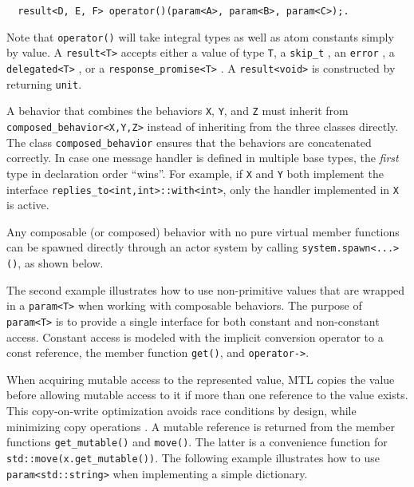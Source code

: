 \begin{lstlisting}
  result<D, E, F> operator()(param<A>, param<B>, param<C>);.
\end{lstlisting}

Note that \lstinline^operator()^ will take integral types as well as atom
constants simply by value. A \lstinline^result<T>^ accepts either a value of
type \lstinline^T^, a \lstinline^skip_t^ , an
\lstinline^error^ , a \lstinline^delegated<T>^ , or a
\lstinline^response_promise<T>^ . A \lstinline^result<void>^ is
constructed by returning \lstinline^unit^.

A behavior that combines the behaviors \lstinline^X^, \lstinline^Y^, and
\lstinline^Z^ must inherit from \lstinline^composed_behavior<X,Y,Z>^ instead of
inheriting from the three classes directly. The class
\lstinline^composed_behavior^ ensures that the behaviors are concatenated
correctly. In case one message handler is defined in multiple base types, the
\emph{first} type in declaration order ``wins''. For example, if \lstinline^X^
and \lstinline^Y^ both implement the interface
\lstinline^replies_to<int,int>::with<int>^, only the handler implemented in
\lstinline^X^ is active.

Any composable (or composed) behavior with no pure virtual member functions can
be spawned directly through an actor system by calling
\lstinline^system.spawn<...>()^, as shown below.


\clearpage

The second example illustrates how to use non-primitive values that are wrapped
in a \lstinline^param<T>^ when working with composable behaviors. The purpose
of \lstinline^param<T>^ is to provide a single interface for both constant and
non-constant access. Constant access is modeled with the implicit conversion
operator to a const reference, the member function \lstinline^get()^, and
\lstinline^operator->^.

When acquiring mutable access to the represented value, MTL copies the value
before allowing mutable access to it if more than one reference to the value
exists. This copy-on-write optimization avoids race conditions by design, while
minimizing copy operations . A mutable reference is returned
from the member functions \lstinline^get_mutable()^ and \lstinline^move()^. The
latter is a convenience function for \lstinline^std::move(x.get_mutable())^.
The following example illustrates how to use \lstinline^param<std::string>^
when implementing a simple dictionary.

